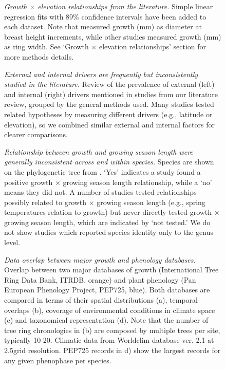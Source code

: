 \documentclass[11pt]{article}
\begin{document}
\begin{figure}[h!]
\caption{\emph{Growth $\times$ elevation relationships from the literature.} Simple linear regression fits with 89\% confidence intervals have been added to each dataset. Note that \cite{oleksyn1998growth} measured growth (mm) as diameter at breast height increments, while other studies \citep{wang2017climatic,zhou2022altitudinal} measured growth (mm) as ring width. See `Growth $\times$ elevation relationships' section for more methods details.} 
\end{figure}

\begin{figure}[h!]
\caption{\emph{External and internal drivers are frequently but inconsistently studied in the literature.} Review of the prevalence of external (left) and internal (right) drivers mentioned in studies from our literature review, grouped by the general methods used. Many studies tested related hypotheses by measuring different drivers (e.g., latitude or elevation), so we combined similar external and internal factors for clearer comparisons.}
\end{figure}

\begin{figure}[h!]
\caption{\emph{Relationship between growth and growing season length were generally inconsistent across and within species.} Species are shown on the phylogenetic tree from \cite{smith2018constructing}. `Yes' indicates a study found a positive growth $\times$ growing season length relationship, while a `no' means they did not. A number of studies tested relationships possibly related to growth $\times$ growing season length (e.g., spring temperatures relation to growth) but never directly tested growth $\times$ growing season length, which are indicated by `not tested.' We do not show studies which reported species identity only to the genus level.}
\end{figure}

\begin{figure}[h!]
\caption{\emph{Data overlap between major growth and phenology databases.} Overlap between two major databases of growth (International Tree Ring Data Bank, ITRDB, orange) and plant phenology (Pan European Phenology Project, PEP725, blue). Both databases are compared in terms of their spatial distributions (a), temporal overlaps (b), coverage of environmental conditions in climate space (c) and taxonomical representation (d). Note that the number of tree ring chronologies in (b) are composed by multiple trees per site, typically 10-20. Climatic data from Worldclim database ver. 2.1 at 2.5\degree grid resolution. PEP725 records in d) show the largest records for any given phenophase per species.}
\end{figure}
\fi
\end{document}
